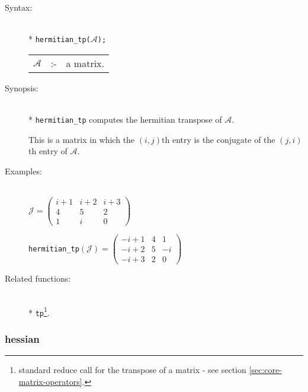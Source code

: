 \begin{description}
\item[Syntax:]\mbox{}\\*
\texttt{hermitian\_tp($\mathcal{A}$);}\\[2mm]
\begin{tabular}{l l l}
$\mathcal{A}$ &:-& a matrix.
\end{tabular}

\item[Synopsis:]\mbox{}\\*
         \texttt{hermitian\_tp} computes the hermitian transpose of $\mathcal{A}$.

This is a matrix in which the $(i,j)$th entry is the conjugate of the $(j,i)$th
entry of $\mathcal{A}$.

\item[Examples:]\mbox{}\\
  \(\mathcal{J} = \begin{pmatrix} i+1 & i+2 & i+3 \\ 4 & 5 & 2 \\ 1 &
    i & 0 \end{pmatrix}\)

  \texttt{hermitian\_tp}\((\mathcal{J})  =
  \begin{pmatrix} -i+1 & 4 & 1 \\ -i+2 & 5 & -i \\-i+3 & 2 & 0 \end{pmatrix}\)

\item[Related functions:]\mbox{}\\*
\texttt{tp}\footnote{standard reduce call for the
transpose of a matrix - see section \protect\ref{sec:core-matrix-operators}.}.
\end{description}


\subsubsection{hessian}
\label{linalg:hessian}
\hypertarget{operator:HESSIAN}{}

